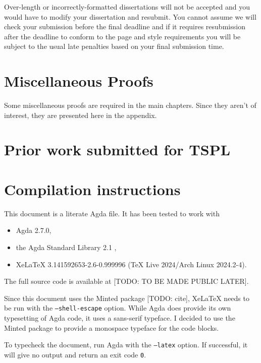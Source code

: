 \documentclass[logo,bsc,singlespacing,parskip,online]{infthesis}
\begin{document}
Over-length or incorrectly-formatted dissertations will not be accepted and you
would have to modify your dissertation and resubmit. You cannot assume we will
check your submission before the final deadline and if it requires resubmission
after the deadline to conform to the page and style requirements you will be
subject to the usual late penalties based on your final submission time.





\appendix

\chapter{Miscellaneous Proofs}
\label{appendix:misc_proofs}

Some miscellaneous proofs are required in the main chapters. Since they aren't of interest, they are presented here in the appendix.



\chapter{Prior work submitted for TSPL}
\label{appendix:tspl}


\chapter{Compilation instructions}
\label{appendix:compilation_instructions}

This document is a literate Agda file. It has been tested to work with
\begin{itemize}
  \item Agda 2.7.0,
  \item the Agda Standard Library 2.1 \citep{the_agda_community_agda_2024},
  \item XeLaTeX 3.141592653-2.6-0.999996 (TeX Live 2024/Arch Linux 2024.2-4).
\end{itemize}

The full source code is available at [TODO: TO BE MADE PUBLIC LATER].

Since this document uses the Minted package [TODO: cite], XeLaTeX needs to be run with the
\texttt{--shell-escape} option. While Agda does provide its own typesetting of Agda code, it uses a
sans-serif typeface. I decided to use the Minted package to provide a monospace typeface for the
code blocks.

To typecheck the document, run Agda with the \texttt{--latex} option. If successful, it will give no
output and return an exit code \texttt{0}.
\end{document}

